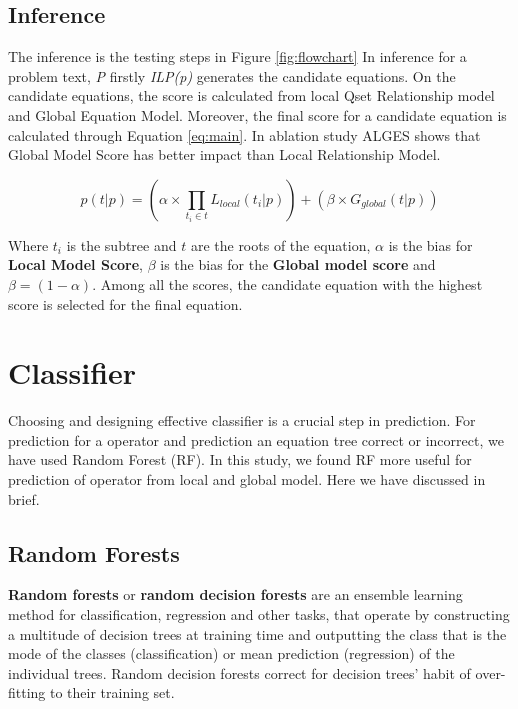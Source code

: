 \documentclass[document.tex]{subfiles}
\begin{document}
\subsection{Inference}
The inference is the testing steps in Figure \ref{fig:flowchart} In inference for a problem text, \textit{P} firstly \textit{ILP(p)} generates the candidate equations. On the candidate equations, the score is calculated from local Qset Relationship model and Global Equation Model. Moreover, the final score for a candidate equation is calculated through Equation \ref{eq:main}. In ablation study ALGES shows that Global Model Score has better impact than Local Relationship Model.

\begin{equation}
	p(t|p) = (\alpha \times \prod_{t_i \in t} L_{local}(t_i | p) ) + (\beta \times G_{global}(t|p))
	\label{eq:main}
\end{equation}

Where $t_i$ is the subtree and $t$ are the roots of the equation, $\alpha$ is the bias for \textbf{Local Model Score}, $\beta$ is the bias for the \textbf{Global model score} and $\beta = (1 - \alpha)$. Among all the scores, the candidate equation with the highest score is selected for the final equation.

\section{Classifier} Choosing and designing effective classifier is a crucial step in prediction. For prediction for a operator and prediction an equation tree correct or incorrect, we have used Random Forest (RF). In this study, we found RF more useful for prediction of operator from local and global model. Here we have discussed in brief.

\subsection{Random Forests}
\textbf{Random forests} or \textbf{random decision forests} are an ensemble learning method for classification, regression and other tasks, that operate by constructing a multitude of decision trees at training time and outputting the class that is the mode of the classes (classification) or mean prediction (regression) of the individual trees. Random decision forests correct for decision trees' habit of over-fitting to their training set.
\end{document}
